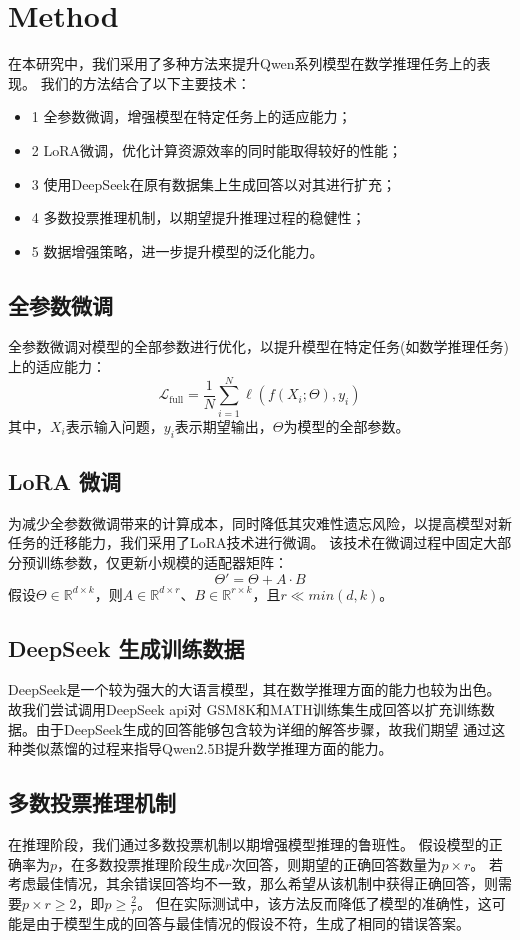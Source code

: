 \documentclass{article}
\begin{document}
\section{Method}


\par 在本研究中，我们采用了多种方法来提升Qwen系列模型在数学推理任务上的表现。
我们的方法结合了以下主要技术：
\begin{itemize}
    \item1 全参数微调，增强模型在特定任务上的适应能力；
    \item2 LoRA微调，优化计算资源效率的同时能取得较好的性能；
    \item3 使用DeepSeek在原有数据集上生成回答以对其进行扩充；
    \item4 多数投票推理机制，以期望提升推理过程的稳健性；
    \item5 数据增强策略，进一步提升模型的泛化能力。
\end{itemize}
 
\subsection{全参数微调}
全参数微调对模型的全部参数进行优化，以提升模型在特定任务(如数学推理任务)上的适应能力：
$$
\mathcal{L}_{\text{full}} = \frac{1}{N} \sum_{i=1}^N \ell(f(X_i; \Theta), y_i)
$$
其中，$X_i$表示输入问题，$y_i$表示期望输出，$\Theta$为模型的全部参数。

\subsection{LoRA 微调}
为减少全参数微调带来的计算成本，同时降低其灾难性遗忘风险，以提高模型对新任务的迁移能力，我们采用了LoRA技术进行微调。
该技术在微调过程中固定大部分预训练参数，仅更新小规模的适配器矩阵：
$$
\Theta' = \Theta + A \cdot B
$$
假设$\Theta \in \mathbb{R}^{d \times k}$，则$A \in \mathbb{R}^{d \times r}$、$B \in \mathbb{R}^{r \times k}$，且$r \ll min(d, k)$。

\subsection{DeepSeek 生成训练数据}
DeepSeek是一个较为强大的大语言模型，其在数学推理方面的能力也较为出色。故我们尝试调用DeepSeek api对
GSM8K和MATH训练集生成回答以扩充训练数据。由于DeepSeek生成的回答能够包含较为详细的解答步骤，故我们期望
通过这种类似蒸馏的过程来指导Qwen2.5B提升数学推理方面的能力。

\subsection{多数投票推理机制}
在推理阶段，我们通过多数投票机制以期增强模型推理的鲁班性。
假设模型的正确率为$p$，在多数投票推理阶段生成$r$次回答，则期望的正确回答数量为$p \times r$。
若考虑最佳情况，其余错误回答均不一致，那么希望从该机制中获得正确回答，则需要$p \times r \ge 2$，即$p \ge \frac{2}{r}$。
但在实际测试中，该方法反而降低了模型的准确性，这可能是由于模型生成的回答与最佳情况的假设不符，生成了相同的错误答案。
\end{document}
